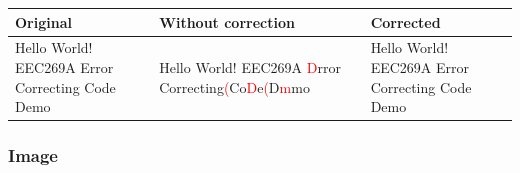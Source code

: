 \documentclass{article}
\begin{document}
\begin{center}
    \renewcommand{\arraystretch}{1.5}
    \begin{tabulary}{\textwidth}{ |L|L|L| } 
    \hline
    \textbf{Original} & \textbf{Without correction} & \textbf{Corrected} \\
    \hline
    Hello World! EEC269A Error Correcting Code Demo & Hello World! EEC269A \textcolor{red}{D}rror Correcting\textcolor{red}{(}Co\textcolor{red}{D}e\textcolor{red}{(}D\textcolor{red}{m}mo & Hello World! EEC269A Error Correcting Code Demo \\
    \hline
    \end{tabulary}
\end{center}



\subsubsection{Image}
\end{document}
